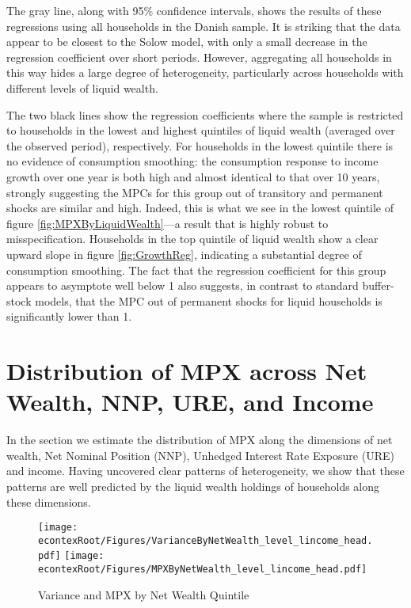 \documentclass[titlepage]{\econtex}\newcommand{\texname}{ConsumptionHeterogeneity}
\begin{document}
	The gray line, along with 95\% confidence intervals, shows the results of these regressions using all households in the Danish sample. It is striking that the data appear to be closest to the Solow model, with only a small decrease in the regression coefficient over short periods. However, aggregating all households in this way hides a large degree of heterogeneity, particularly across households with different levels of liquid wealth.
	
	The two black lines show the regression coefficients where the sample is restricted to households in the lowest and highest quintiles of liquid wealth (averaged over the observed period), respectively. For households in the lowest quintile there is no evidence of consumption smoothing: the consumption response to income growth over one year is both high and almost identical to that over 10 years, strongly suggesting the MPCs for this group out of transitory and permanent shocks are similar and high. Indeed, this is what we see in the lowest quintile of figure \ref{fig:MPXByLiquidWealth}---a result that is highly robust to misspecification. Households in the top quintile of liquid wealth show a clear upward slope in figure \ref{fig:GrowthReg}, indicating a substantial degree of consumption smoothing. The fact that the regression coefficient for this group appears to asymptote well below 1 also suggests, in contrast to standard buffer-stock models, that the MPC out of permanent shocks for liquid households is significantly lower than 1.
	
	\section{Distribution of MPX across Net Wealth, NNP, URE, and Income}
	In the section we estimate the distribution of MPX along the dimensions of net wealth,  Net Nominal Position (NNP), Unhedged Interest Rate Exposure (URE) and income. Having uncovered clear patterns of heterogeneity, we show that these patterns are well predicted by the liquid wealth holdings of households along these dimensions.  

	\begin{figure}
	\centering
	\texttt{[image: \\econtexRoot/Figures/VarianceByNetWealth\_level\_lincome\_head.pdf]}
	\centering
	\texttt{[image: \\econtexRoot/Figures/MPXByNetWealth\_level\_lincome\_head.pdf]}
	\caption{Variance and MPX by Net Wealth Quintile}
	\label{fig:MPXByNetWealth}
	\end{figure}
\end{document}
